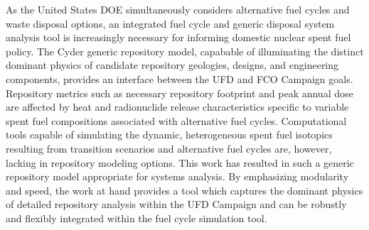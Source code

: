 As the United States \gls{DOE} simultaneously considers alternative fuel cycles 
and waste disposal options, an integrated fuel cycle and generic disposal system 
analysis tool is increasingly necessary for informing domestic nuclear spent 
fuel policy. The Cyder generic repository model, capabable of illuminating the distinct 
dominant physics of candidate repository geologies, designs, and engineering 
components, provides an interface between the \gls{UFD} and \gls{FCO} Campaign 
goals. Repository metrics such as necessary repository footprint and peak annual 
dose are affected by heat and radionuclide release characteristics specific to 
variable spent fuel compositions associated  with alternative fuel cycles. 
Computational tools capable of simulating the dynamic, heterogeneous spent fuel 
isotopics resulting from transition scenarios and alternative fuel cycles 
are, however, lacking in repository modeling  options. This work has resulted 
in such a generic repository model appropriate for systems analysis. By 
emphasizing modularity and speed, the work at hand provides a tool 
which captures the dominant physics of detailed repository analysis within the 
\gls{UFD} Campaign and can be robustly and flexibly integrated within the 
\Cyclus fuel cycle simulation tool.

\glsresetall
